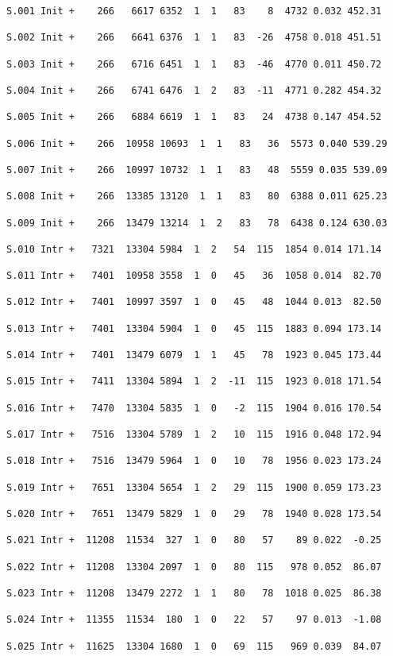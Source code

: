 \documentclass[en,black,10pt,normal]{elegantnote}
\begin{document}
\begin{lstlisting}[frame=single]
S.001 Init +    266   6617 6352  1  1   83    8  4732 0.032 452.31

S.002 Init +    266   6641 6376  1  1   83  -26  4758 0.018 451.51

S.003 Init +    266   6716 6451  1  1   83  -46  4770 0.011 450.72

S.004 Init +    266   6741 6476  1  2   83  -11  4771 0.282 454.32

S.005 Init +    266   6884 6619  1  1   83   24  4738 0.147 454.52

S.006 Init +    266  10958 10693  1  1   83   36  5573 0.040 539.29

S.007 Init +    266  10997 10732  1  1   83   48  5559 0.035 539.09

S.008 Init +    266  13385 13120  1  1   83   80  6388 0.011 625.23

S.009 Init +    266  13479 13214  1  2   83   78  6438 0.124 630.03

S.010 Intr +   7321  13304 5984  1  2   54  115  1854 0.014 171.14

S.011 Intr +   7401  10958 3558  1  0   45   36  1058 0.014  82.70

S.012 Intr +   7401  10997 3597  1  0   45   48  1044 0.013  82.50

S.013 Intr +   7401  13304 5904  1  0   45  115  1883 0.094 173.14

S.014 Intr +   7401  13479 6079  1  1   45   78  1923 0.045 173.44

S.015 Intr +   7411  13304 5894  1  2  -11  115  1923 0.018 171.54

S.016 Intr +   7470  13304 5835  1  0   -2  115  1904 0.016 170.54

S.017 Intr +   7516  13304 5789  1  2   10  115  1916 0.048 172.94

S.018 Intr +   7516  13479 5964  1  0   10   78  1956 0.023 173.24

S.019 Intr +   7651  13304 5654  1  2   29  115  1900 0.059 173.23

S.020 Intr +   7651  13479 5829  1  0   29   78  1940 0.028 173.54

S.021 Intr +  11208  11534  327  1  0   80   57    89 0.022  -0.25

S.022 Intr +  11208  13304 2097  1  0   80  115   978 0.052  86.07

S.023 Intr +  11208  13479 2272  1  1   80   78  1018 0.025  86.38

S.024 Intr +  11355  11534  180  1  0   22   57    97 0.013  -1.08

S.025 Intr +  11625  13304 1680  1  0   69  115   969 0.039  84.07


\end{lstlisting}
\end{document}
